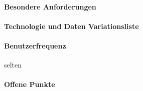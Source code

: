 \paragraph{Besondere Anforderungen}

\paragraph{Technologie und Daten Variationsliste}

\paragraph{Benutzerfrequenz}
selten

\paragraph{Offene Punkte}

\newpage
